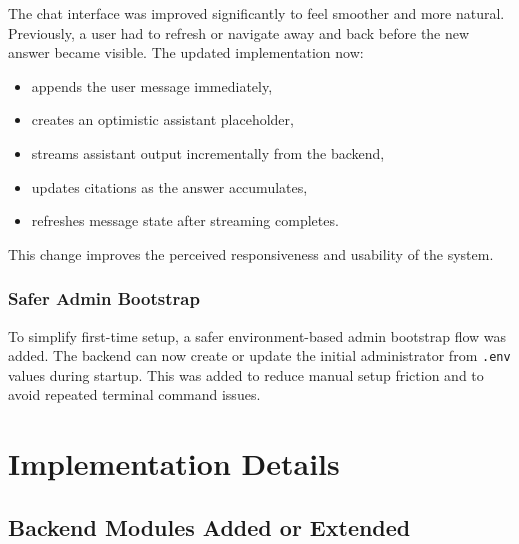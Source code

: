 \documentclass[12pt,a4paper]{report}
\begin{document}
The chat interface was improved significantly to feel smoother and more natural. Previously, a user had to refresh or navigate away and back before the new answer became visible. The updated implementation now:
\begin{itemize}[leftmargin=1.5em]
\item appends the user message immediately,
\item creates an optimistic assistant placeholder,
\item streams assistant output incrementally from the backend,
\item updates citations as the answer accumulates,
\item refreshes message state after streaming completes.
\end{itemize}

This change improves the perceived responsiveness and usability of the system.

\subsection{Safer Admin Bootstrap}

To simplify first-time setup, a safer environment-based admin bootstrap flow was added. The backend can now create or update the initial administrator from \texttt{.env} values during startup. This was added to reduce manual setup friction and to avoid repeated terminal command issues.

\chapter{Implementation Details}

\section{Backend Modules Added or Extended}
\end{document}
